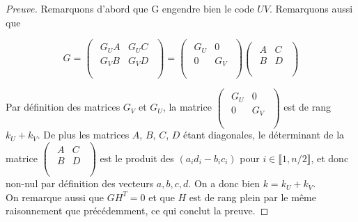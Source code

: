 \documentclass[12pt]{article}
\theoremstyle{plain}
\theoremstyle{definition}
\begin{document}
\begin{proof}[Preuve]
Remarquons d'abord que G engendre bien le code $UV$. Remarquons aussi que 

$$
G = 
\begin{pmatrix}
\begin{array}{c|c}
G_UA & G_UC \\
 \hline 
G_VB & G_VD \\
\end{array} \\
\end{pmatrix}
= 
\begin{pmatrix}
\begin{array}{c|c}
G_U & 0 \\
 \hline 
0 & G_V \\
\end{array} \\
\end{pmatrix} 
\begin{pmatrix}
\begin{array}{c|c}
A & C \\
 \hline 
B & D \\
\end{array} \\
\end{pmatrix}
$$

\noindent Par définition des matrices $G_V$ et $G_U$, la matrice $ 
\begin{pmatrix}
\begin{array}{c|c}
G_U & 0 \\
 \hline 
0 & G_V \\
\end{array} \\
\end{pmatrix} $ est de rang $k_U + k_V$. De plus les matrices $A$, $B$, $C$, $D$ étant diagonales, le déterminant de la matrice $\begin{pmatrix}
\begin{array}{c|c}
A & C \\
 \hline 
B & D \\
\end{array} \\
\end{pmatrix}$
est le produit des $(a_id_i - b_ic_i)$ pour $i \in \llbracket 1, n/2\rrbracket$, et donc non-nul par définition des vecteurs $a,b,c,d$. On a donc bien $k = k_U + k_V$. \\
On remarque aussi que $GH^T = 0$ et que $H$ est de rang plein par le même raisonnement que précédemment, ce qui conclut la preuve.
\end{proof}
\end{document}
